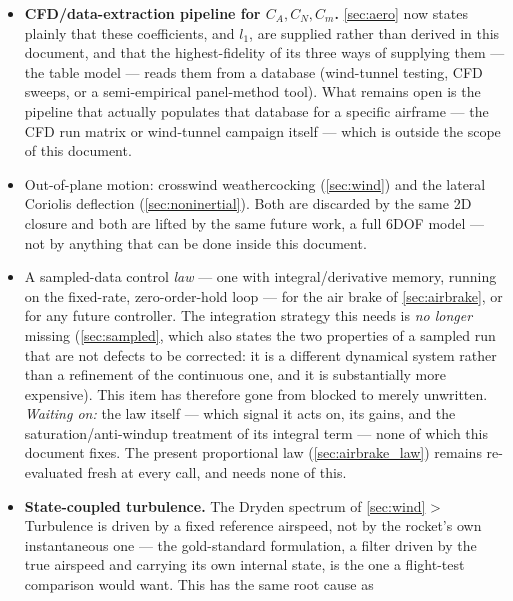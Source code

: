 \documentclass[10pt]{extarticle}
\numberwithin{equation}{subsection}
\begin{document}
\begin{itemize}
    wind), each needing a data source (terrain elevation, or surface heat-flux/insolation data)
    this project does not currently have. Deliberately on hold pending research into which family,
    if either, is worth the added dependency --- not to be implemented before that research is
    done.
    \item \textbf{CFD/data-extraction pipeline for $C_A,C_N,C_m$.} \autoref{sec:aero} now states
    plainly that these coefficients, and $l_1$, are supplied rather than derived in this document,
    and that the highest-fidelity of its three ways of supplying them --- the table model --- reads
    them from a database (wind-tunnel testing, CFD sweeps, or a semi-empirical panel-method tool).
    What remains open is the pipeline that actually populates that database for a specific
    airframe --- the CFD run matrix or wind-tunnel campaign itself --- which is outside the scope
    of this document.
    \item Out-of-plane motion: crosswind weathercocking (\autoref{sec:wind}) and the lateral
    Coriolis deflection (\autoref{sec:noninertial}). Both are discarded by the same 2D closure and
    both are lifted by the same future work, a full 6DOF model --- not by anything that can be
    done inside this document.
    \item A sampled-data control \emph{law} --- one with integral/derivative memory, running on the
    fixed-rate, zero-order-hold loop --- for the air brake of \autoref{sec:airbrake}, or for any
    future controller. The integration strategy this needs is \emph{no longer} missing
    (\autoref{sec:sampled}, which also states the two properties of a sampled run that are not
    defects to be corrected: it is a different dynamical system rather than a refinement of the
    continuous one, and it is substantially more expensive). This item has therefore gone from
    blocked to merely unwritten. \emph{Waiting on:} the law itself --- which signal it acts on, its
    gains, and the saturation/anti-windup treatment of its integral term --- none of which this
    document fixes. The present proportional law (\autoref{sec:airbrake_law}) remains re-evaluated
    fresh at every call, and needs none of this.
    \item \textbf{State-coupled turbulence.} The Dryden spectrum of \autoref{sec:wind} >
    Turbulence is driven by a fixed reference airspeed, not by the rocket's own instantaneous one
    --- the gold-standard formulation, a filter driven by the true airspeed and carrying its own
    internal state, is the one a flight-test comparison would want. This has the same root cause as

\end{itemize}
\end{document}
